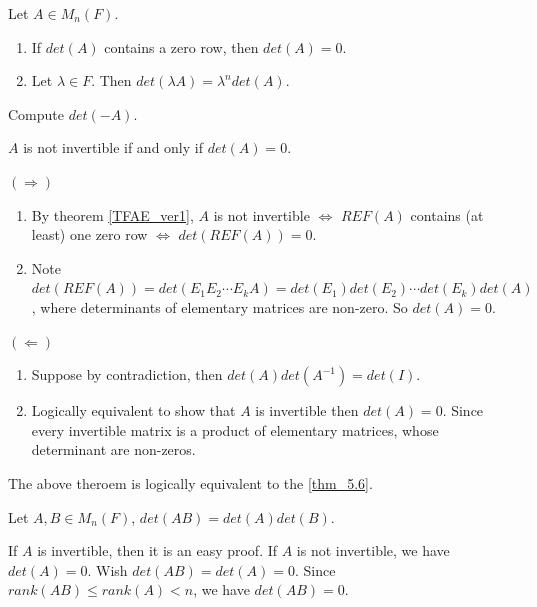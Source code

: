 \documentclass[12pt]{article}
\begin{document}
\begin{theorem}
Let $A\in M_n(F).$
\begin{enumerate}
    \item If $det(A)$ contains a zero row, then $det(A)=0$.
    \item Let $\lambda\in F$. Then $det(\lambda A) = \lambda^n det(A)$.
\end{enumerate}
\end{theorem}

\begin{exercise}
    Compute $det(-A)$.
\end{exercise}

\begin{theorem}
    $A$ is not invertible if and only if $det(A)=0$.
\end{theorem}
\begin{pfbox}
    $(\Rightarrow)$
    \begin{enumerate}
        \item By theorem \eqref{TFAE_ver1}, $A$ is not invertible $\Leftrightarrow$ $REF(A)$ contains (at least) one zero row $\Leftrightarrow$ $det(REF(A))=0$.
        \item Note $det(REF(A))=det(E_1 E_2 \cdots E_k A)=det(E_1)det(E_2)\cdots det(E_k)det(A)$, where determinants of elementary matrices are non-zero. So $det(A)=0$.
    \end{enumerate}
    $(\Leftarrow)$
    \begin{enumerate}
        \item Suppose by contradiction, then $det(A)det(A^{-1})=det(I)$.
        \item Logically equivalent to show that $A$ is invertible then $det(A)=0$. Since every invertible matrix is a product of elementary matrices, whose determinant are non-zeros.
    \end{enumerate}
    \end{pfbox}

\begin{remark}
    The above theroem is logically equivalent to the \eqref{thm_5.6}.
\end{remark}


\begin{theorem}
    Let $A,B\in M_n(F)$, $det(AB)=det(A)det(B).$
\end{theorem}

\begin{pfbox}
    If $A$ is invertible, then it is an easy proof.
    If $A$ is not invertible, we have $det(A)=0$.
    Wish $det(AB)=det(A)=0.$ Since $rank(AB)\leq rank(A)<n$, we have $det(AB)=0.$
\end{pfbox}
\end{document}
